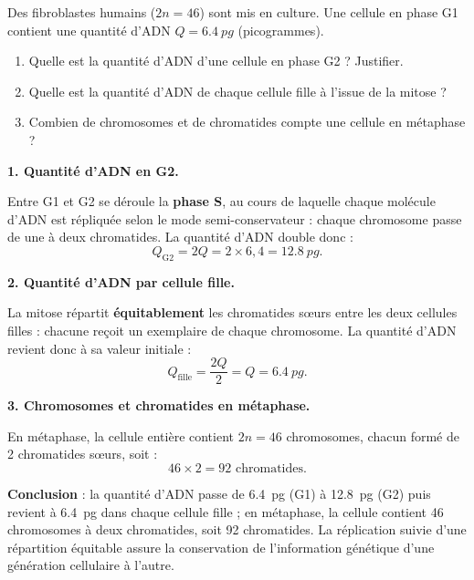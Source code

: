 \documentclass[11pt]{article}
\newcommand{\cle}[1]{{\popxbold\color{popdark}#1}}
\begin{document}
\begin{exoresolu}
Des fibroblastes humains ($2n = 46$) sont mis en culture. Une cellule en phase G1 contient une quantité d'ADN $Q = \SI{6,4}{pg}$ (picogrammes).
\begin{enumerate}
\item Quelle est la quantité d'ADN d'une cellule en phase G2 ? Justifier.
\item Quelle est la quantité d'ADN de chaque cellule fille à l'issue de la mitose ?
\item Combien de chromosomes et de chromatides compte une cellule en métaphase ?
\end{enumerate}
\tcblower
\textbf{1. Quantité d'ADN en G2.}

Entre G1 et G2 se déroule la \textbf{phase S}, au cours de laquelle chaque molécule d'ADN est répliquée selon le mode \cle{semi-conservateur} : chaque chromosome passe de une à deux chromatides. La quantité d'ADN double donc :
\[ Q_{\mathrm{G2}} = 2Q = 2 \times 6{,}4 = \SI{12,8}{pg}. \]

\textbf{2. Quantité d'ADN par cellule fille.}

La mitose répartit \textbf{équitablement} les chromatides sœurs entre les deux cellules filles : chacune reçoit un exemplaire de chaque chromosome. La quantité d'ADN revient donc à sa valeur initiale :
\[ Q_{\text{fille}} = \frac{2Q}{2} = Q = \SI{6,4}{pg}. \]

\textbf{3. Chromosomes et chromatides en métaphase.}

En métaphase, la cellule entière contient $2n = 46$ chromosomes, chacun formé de 2 chromatides sœurs, soit :
\[ 46 \times 2 = 92 \text{ chromatides.} \]

\textbf{Conclusion} : la quantité d'ADN passe de \SI{6,4}{pg} (G1) à \SI{12,8}{pg} (G2) puis revient à \SI{6,4}{pg} dans chaque cellule fille ; en métaphase, la cellule contient 46 chromosomes à deux chromatides, soit 92 chromatides. La réplication suivie d'une répartition équitable assure la conservation de l'information génétique d'une génération cellulaire à l'autre.
\end{exoresolu}
\end{document}
